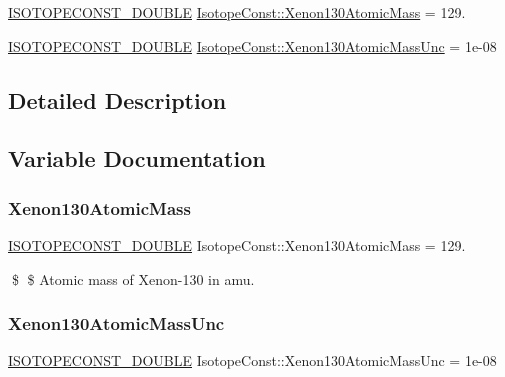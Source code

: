 \begin{DoxyCompactItemize}
\item 
\mbox{\hyperlink{group___isotope_const-_macros_ga8f45a7272ce02c0b4c65c44636ed719a}{I\+S\+O\+T\+O\+P\+E\+C\+O\+N\+S\+T\+\_\+\+D\+O\+U\+B\+LE}} \mbox{\hyperlink{group___isotope_const-_xenon-_xe130_ga2b13bf4910c860ad05ab2ed33e9a4068}{Isotope\+Const\+::\+Xenon130\+Atomic\+Mass}} = 129.
\item 
\mbox{\hyperlink{group___isotope_const-_macros_ga8f45a7272ce02c0b4c65c44636ed719a}{I\+S\+O\+T\+O\+P\+E\+C\+O\+N\+S\+T\+\_\+\+D\+O\+U\+B\+LE}} \mbox{\hyperlink{group___isotope_const-_xenon-_xe130_ga421ac584485ea04e9eeb93b9435b119a}{Isotope\+Const\+::\+Xenon130\+Atomic\+Mass\+Unc}} = 1e-\/08
\end{DoxyCompactItemize}


\subsection{Detailed Description}


\subsection{Variable Documentation}
\mbox{\label{group___isotope_const-_xenon-_xe130_ga2b13bf4910c860ad05ab2ed33e9a4068}} 
\subsubsection{\texorpdfstring{Xenon130\+Atomic\+Mass}{Xenon130AtomicMass}}
{\footnotesize\ttfamily \mbox{\hyperlink{group___isotope_const-_macros_ga8f45a7272ce02c0b4c65c44636ed719a}{I\+S\+O\+T\+O\+P\+E\+C\+O\+N\+S\+T\+\_\+\+D\+O\+U\+B\+LE}} Isotope\+Const\+::\+Xenon130\+Atomic\+Mass = 129.}

\$ \$ Atomic mass of Xenon-\/130 in amu. \mbox{\label{group___isotope_const-_xenon-_xe130_ga421ac584485ea04e9eeb93b9435b119a}} 
\subsubsection{\texorpdfstring{Xenon130\+Atomic\+Mass\+Unc}{Xenon130AtomicMassUnc}}
{\footnotesize\ttfamily \mbox{\hyperlink{group___isotope_const-_macros_ga8f45a7272ce02c0b4c65c44636ed719a}{I\+S\+O\+T\+O\+P\+E\+C\+O\+N\+S\+T\+\_\+\+D\+O\+U\+B\+LE}} Isotope\+Const\+::\+Xenon130\+Atomic\+Mass\+Unc = 1e-\/08}

